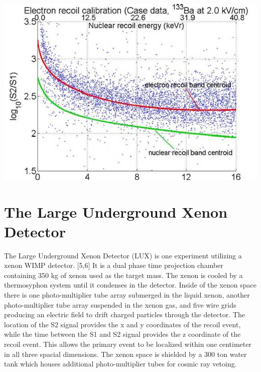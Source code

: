 \documentclass[a4paper,12pt]{article}
\begin{document}
\begin{center}
\includegraphics[scale=0.75]{Recoils.jpg}
\end{center}


\section{The Large Underground Xenon Detector}

The Large Underground Xenon Detector (LUX) is one experiment utilizing a xenon WIMP detector. [5,6] It is a dual phase time projection chamber containing 350 kg of xenon used as the target mass.  The xenon is cooled by a thermosyphon system until it condenses in the detector.  Inside of the xenon space there is one photo-multiplier tube array submerged in the liquid xenon, another photo-multiplier tube array suspended in the xenon gas, and five wire grids producing an electric field to drift charged particles through the detector.  The location of the S2 signal provides the x and y coordinates of the recoil event, while the time between the S1 and S2 signal provides the z coordinate of the recoil event.  This allows the primary event to be localized within one centimeter in all three spacial dimensions.  The xenon space is shielded by a 300 ton water tank which houses additional photo-multiplier tubes for cosmic ray vetoing. 
\end{document}
